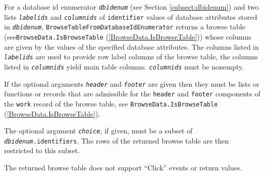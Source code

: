 \documentclass[a4paper,11pt]{report}
\begin{document}
{{{ For a database id enumerator \mbox{\texttt{\mdseries\slshape dbidenum}} (see Section \ref{subsect:dbidenum}) and two lists \mbox{\texttt{\mdseries\slshape labelids}} and \mbox{\texttt{\mdseries\slshape columnids}} of \texttt{identifier} values of database attributes stored in \mbox{\texttt{\mdseries\slshape dbidenum}}, \texttt{BrowseTableFromDatabaseIdEnumerator} returns a browse table (see{\nobreakspace}\texttt{BrowseData.IsBrowseTable} (\ref{BrowseData.IsBrowseTable})) whose columns are given by the values of the specified database attributes.
The columns listed in \mbox{\texttt{\mdseries\slshape labelids}} are used to provide row label columns of the browse table, the columns listed
in \mbox{\texttt{\mdseries\slshape columnids}} yield main table columns. \mbox{\texttt{\mdseries\slshape columnids}} must be nonempty. 

 If the optional arguments \mbox{\texttt{\mdseries\slshape header}} and \mbox{\texttt{\mdseries\slshape footer}} are given then they must be lists or functions or records that are admissible
for the \texttt{header} and \texttt{footer} components of the \texttt{work} record of the browse table, see \texttt{BrowseData.IsBrowseTable} (\ref{BrowseData.IsBrowseTable}). 

 The optional argument \mbox{\texttt{\mdseries\slshape choice}}, if given, must be a subset of \mbox{\texttt{\mdseries\slshape dbidenum}}\texttt{.identifiers}. The rows of the returned browse table are then restricted to this subset. 

 The returned browse table does not support ``Click'' events or return values. }

 }

  
}
\end{document}
